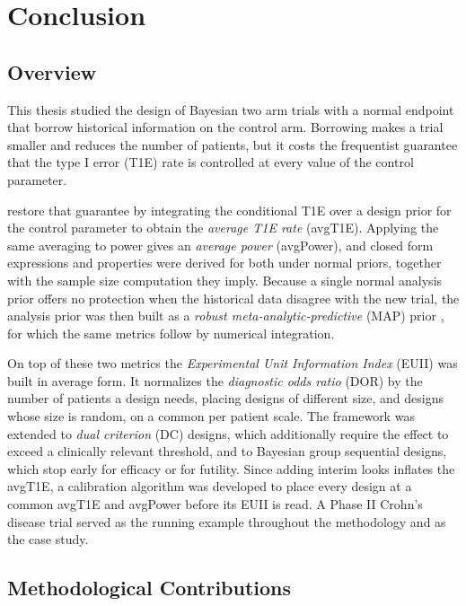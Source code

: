 \chapter{Conclusion}
\label{sec:conclusion}

\section{Overview}

This thesis studied the design of Bayesian two arm trials with a normal endpoint that borrow
historical information on the control arm. Borrowing makes a trial smaller and reduces the number of
patients, but it costs the frequentist guarantee that the type I error (T1E)
rate is controlled at every value of the control parameter. 

\citet{best_beyond_2025} restore that guarantee by integrating the conditional T1E
over a design prior for the control parameter to obtain the \textit{average T1E rate} (avgT1E).
Applying the same averaging to power gives an \textit{average power} (avgPower), and closed form expressions and
properties were derived for both under normal priors, together with the sample size computation they
imply. Because a single normal analysis prior offers no protection when the historical data disagree
with the new trial, the analysis prior was then built as a \textit{robust meta-analytic-predictive}
(MAP) prior \citep{schmidli_robust_2014}, for which the same metrics follow by numerical integration.

On top of these two metrics the \textit{Experimental Unit Information Index} (EUII)
\citep{held2025balancing} was built in average form. It normalizes the \textit{diagnostic odds ratio}
(DOR) by the number of patients a design needs, placing designs of different size, and designs whose
size is random, on a common per patient scale. The framework was extended to \textit{dual criterion}
(DC) designs, which additionally require the effect to exceed a clinically relevant threshold, and to
Bayesian group sequential designs, which stop early for efficacy or for futility. Since adding interim
looks inflates the avgT1E, a calibration algorithm was developed to place every design at a common
avgT1E and avgPower before its EUII is read. A Phase II Crohn's disease trial served as the running
example throughout the methodology and as the case study.


\section{Methodological Contributions}

